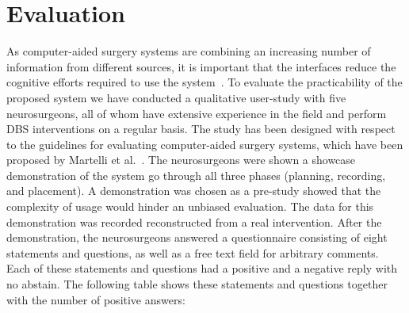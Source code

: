 \documentclass[review]{vgtc}                 %
\begin{document}
\section{Evaluation}\label{sec:evaluation}
As computer-aided surgery systems are combining an increasing number of information from different sources, it is important that the interfaces reduce the cognitive efforts required to use the system~\cite{Visarius1997,Martelli2003}. To evaluate the practicability of the proposed system we have conducted a qualitative user-study with five neurosurgeons, all of whom have extensive experience in the field and perform DBS interventions on a regular basis. The study has been designed with respect to the guidelines for evaluating computer-aided surgery systems, which have been proposed by Martelli et al.~\cite{Martelli2003}. The neurosurgeons were shown a showcase demonstration of the system go through all three phases (planning, recording, and placement). A demonstration was chosen as a pre-study showed that the complexity of usage would hinder an unbiased evaluation. The data for this demonstration was recorded reconstructed from a real intervention. After the demonstration, the neurosurgeons answered a questionnaire consisting of eight statements and questions, as well as a free text field for arbitrary comments. Each of these statements and questions had a positive and a negative reply with no abstain. The following table shows these statements and questions together with the number of positive answers:

\end{document}
